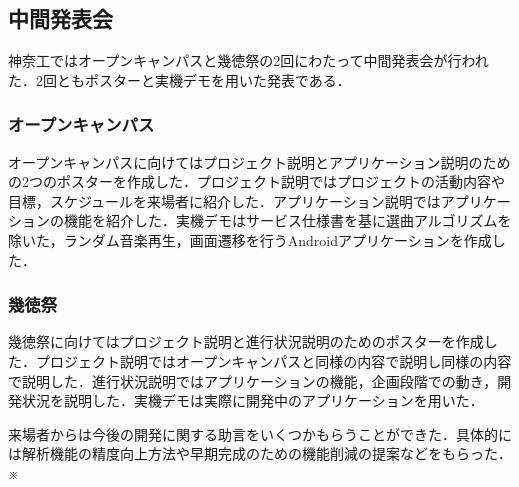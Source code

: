 \subsection{中間発表会}
\par 神奈工ではオープンキャンパスと幾徳祭の2回にわたって中間発表会が行われた．2回ともポスターと実機デモを用いた発表である．

\subsubsection{オープンキャンパス}
\par オープンキャンパスに向けてはプロジェクト説明とアプリケーション説明のための2つのポスターを作成した．プロジェクト説明ではプロジェクトの活動内容や目標，スケジュールを来場者に紹介した．アプリケーション説明ではアプリケーションの機能を紹介した．実機デモはサービス仕様書を基に選曲アルゴリズムを除いた，ランダム音楽再生，画面遷移を行うAndroidアプリケーションを作成した．

\subsubsection{幾徳祭}
\par 幾徳祭に向けてはプロジェクト説明と進行状況説明のためのポスターを作成した．プロジェクト説明ではオープンキャンパスと同様の内容で説明し同様の内容で説明した．進行状況説明ではアプリケーションの機能，企画段階での動き，開発状況を説明した．実機デモは実際に開発中のアプリケーションを用いた．

\par 来場者からは今後の開発に関する助言をいくつかもらうことができた．具体的には解析機能の精度向上方法や早期完成のための機能削減の提案などをもらった．
※
